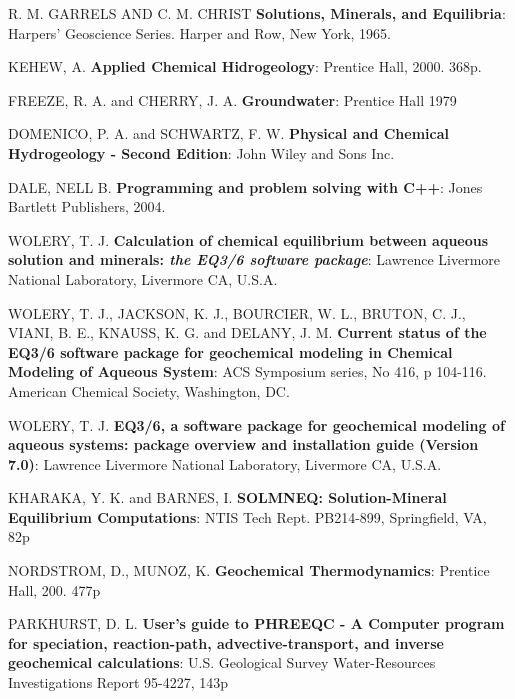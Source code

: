 \documentclass[ppgc,mestrado,english]{iiufrgs}
\begin{document}



\makeglossaries

\renewcommand*\bibname{References}
\begin{thebibliography}{este-parametro-nao-eh-usado-pelo-estilo-ABNT}

 R. M. GARRELS AND C. M. CHRIST
 \textbf{Solutions, Minerals, and Equilibria}: Harpers' Geoscience Series. Harper and Row, New York, 1965.

 KEHEW, A.
 \textbf{Applied Chemical Hidrogeology}: Prentice Hall, 2000. 368p.

 FREEZE, R. A. and CHERRY, J. A.
\textbf{Groundwater}: Prentice Hall 1979

 DOMENICO, P. A. and SCHWARTZ, F. W.
\textbf{Physical and Chemical Hydrogeology - Second Edition}: John Wiley and Sons Inc.

  DALE, NELL B.
 \textbf{Programming and problem solving with C++}: Jones Bartlett Publishers, 2004.
   
 WOLERY, T. J. 
\textbf{Calculation of chemical equilibrium between aqueous solution and minerals: \emph{the EQ3/6 software package}}: Lawrence Livermore National Laboratory, Livermore CA, U.S.A.

 WOLERY, T. J., JACKSON, K. J., BOURCIER, W. L., BRUTON, C. J., VIANI, B. E., KNAUSS, K. G. and DELANY, J. M.
\textbf{Current status of the EQ3/6 software package for geochemical modeling in Chemical Modeling of Aqueous System}: ACS Symposium series, No 416, p 104-116. American Chemical Society, Washington, DC.

 WOLERY, T. J.
\textbf{EQ3/6, a software package for geochemical modeling of aqueous systems: package overview and installation guide (Version 7.0)}: Lawrence Livermore National Laboratory, Livermore CA, U.S.A.

 KHARAKA, Y. K. and BARNES, I.
\textbf{SOLMNEQ: Solution-Mineral Equilibrium Computations}: NTIS Tech Rept. PB214-899, Springfield, VA, 82p

 NORDSTROM, D., MUNOZ, K.
\textbf{Geochemical Thermodynamics}: Prentice Hall, 200. 477p

 PARKHURST, D. L.
\textbf{User's guide to PHREEQC - A Computer program for speciation, reaction-path, advective-transport, and inverse geochemical calculations}: U.S. Geological Survey Water-Resources Investigations Report 95-4227, 143p


\end{thebibliography}
\end{document}
